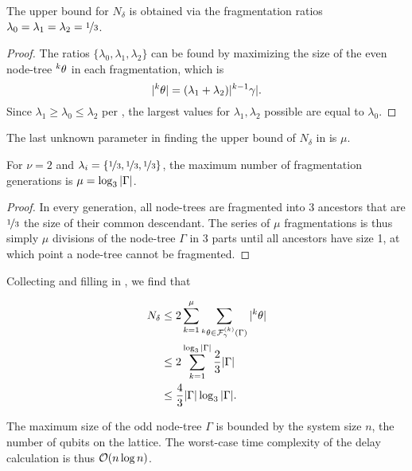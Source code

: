 \begin{theorem}\label{the:ratios}
  The upper bound for $N_\delta$ is obtained via the fragmentation ratios $\lambda_0 = \lambda_1 = \lambda_2 = \nicefrac{1}{3}$.
\end{theorem}
\begin{proof}
  The ratios $\{\lambda_0, \lambda_1, \lambda_2\}$ can be found by maximizing the size of the even node-tree ${}^{k}\theta$ in each fragmentation, which is 
  \begin{equation*}
    \lvert{}^{k}\theta\rvert = (\lambda_1 + \lambda_2)\lvert{}^{k-1}\gamma\rvert.
  \end{equation*}
  Since $ \lambda_1 \geq \lambda_0 \leq \lambda_2$ per , the largest values for $\lambda_1, \lambda_2$ possible are equal to $\lambda_0$.
\end{proof}

The last unknown parameter in finding the upper bound of $N_\delta$ in  is $\mu$.

\begin{theorem}\label{the:km}
  For $\nu = 2$ and $\lambda_i = \{\nicefrac{1}{3},\nicefrac{1}{3},\nicefrac{1}{3}\}$, the maximum number of fragmentation generations is $\mu = \log_3{\lvert\Gamma\rvert}$.
\end{theorem}
\begin{proof}
  In every generation, all node-trees are fragmented into 3 ancestors that are $\nicefrac{1}{3}$ the size of their common descendant. The series of $\mu$ fragmentations is thus simply $\mu$ divisions of the node-tree $\Gamma$ in 3 parts until all ancestors have size 1, at which point a node-tree cannot be fragmented.
\end{proof}

Collecting  and filling in , we find that

\begin{align*}
  \nonumber N_\delta &\leq 2\sum_{k=1}^\mu{ \sum_{  {}^{k} \theta \in \mathcal{F}_\gamma^{(k)}(\Gamma) }{ \lvert {}^{k} \theta\rvert}  } \\
  \nonumber         &\leq 2\sum_{k=1}^{\log_3{\lvert\Gamma\rvert}} \frac{2}{3}\lvert\Gamma\rvert\\
                    &\leq \frac{4}{3}\lvert\Gamma\rvert\log_3{\lvert\Gamma\rvert}.
\end{align*}

The maximum size of the odd node-tree $\Gamma$ is bounded by the system size $n$, the number of qubits on the lattice. The worst-case time complexity of the delay calculation is thus $\mathcal{O}(n\log{n})$. 

